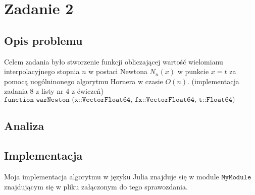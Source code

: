 \section{Zadanie 2}
\subsection{Opis problemu}
Celem zadania było stworzenie funkcji obliczającej wartość wielomianu interpolacyjnego stopnia $ n $ w postaci Newtona $N_n(x)$ w punkcie $ x = t $ za pomocą uogólninonego algorytmu Hornera w czasie $ O(n) $. (implementacja zadania 8 z listy nr 4 z ćwiczeń)
\\ $ \texttt{function warNewton (x::Vector{Float64}, fx::Vector{Float64}, t::Float64)} $ \\
\subsection{Analiza}
\subsection{Implementacja}
Moja implementacja algorytmu w języku Julia znajduje się w module $ \texttt{MyModule} $ znajdującym się w pliku załączonym do tego sprawozdania.